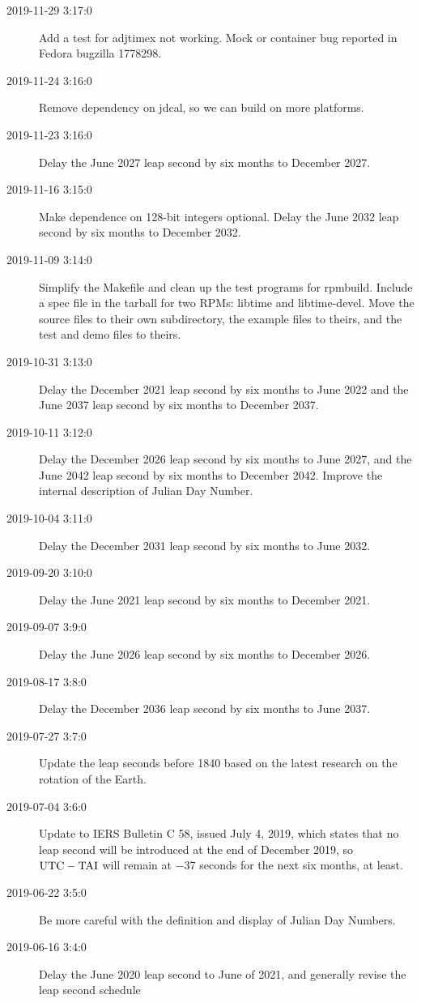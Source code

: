 \documentclass[letterpaper,twoside]{article}
\begin{document}
\begin{description}
\item[2019-11-29 3:17:0]Add a test for adjtimex not working.
  Mock or container bug reported in Fedora bugzilla 1778298.
\item[2019-11-24 3:16:0]Remove dependency on jdcal, so we can build
  on more platforms.
\item[2019-11-23 3:16:0]Delay the June 2027 leap second by six months
  to December 2027.
\item[2019-11-16 3:15:0]Make dependence on 128-bit integers optional.
  Delay the June 2032 leap second by six months to December 2032.
\item[2019-11-09 3:14:0]Simplify the Makefile and clean up the
  test programs for rpmbuild.  Include a spec file in the tarball
  for two RPMs: libtime and libtime-devel.  Move the source
  files to their own subdirectory, the example files to theirs,
  and the test and demo files to theirs.
\item[2019-10-31 3:13:0]Delay the December 2021 leap second by
  six months to June 2022 and the June 2037 leap second by six
  months to December 2037.
\item[2019-10-11 3:12:0]Delay the December 2026 leap second by
  six months to June 2027, and the June 2042 leap second by six
  months to December 2042.  Improve the internal description of
  Julian Day Number.
\item[2019-10-04 3:11:0]Delay the December 2031 leap second by
  six months to June 2032.
\item[2019-09-20 3:10:0]Delay the June 2021 leap second by six
  months to December 2021.
\item[2019-09-07 3:9:0]Delay the June 2026 leap second by six months
  to December 2026.
\item[2019-08-17 3:8:0]Delay the December 2036 leap second by six
  months to June 2037.
\item[2019-07-27 3:7:0]Update the leap seconds before 1840 based
  on the latest research on the rotation of the Earth.
\item[2019-07-04 3:6:0]Update to IERS Bulletin C 58, issued July
  4, 2019, which states that no leap second will be introduced
  at the end of December 2019, so $\rm{UTC}-\rm{TAI}$ will remain at
  \num{-37} seconds for the next six months, at least.  
\item[2019-06-22 3:5:0] Be more careful with the definition
  and display of Julian Day Numbers.
\item[2019-06-16 3:4:0] Delay the June 2020 leap second to
  June of 2021, and generally revise the leap second schedule

\end{description}
\end{document}
